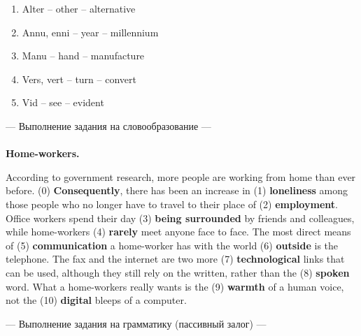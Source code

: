 \documentclass[main.tex]{subfiles}
\begin{document}

\begin{enumerate}[nosep]
	\itemsep\eitsp
	\item Alter -- other -- alternative
	\item Annu, enni -- year -- millennium
	\item Manu -- hand -- manufacture
	\item Vers, vert -- turn -- convert
	\item Vid -- see -- evident
\end{enumerate}
\vspace{7pt}

\newpage
{}

--- Выполнение задания на словообразование ---
\\

\\

\textbf{Home-workers.}

According to government research, more people are working from home than ever before.
(0) \textbf{Consequently}, there has been an increase in (1) \textbf{loneliness} among those people who no longer have to travel to their place of (2) \textbf{employment}.
Office workers spend their day (3) \textbf{being surrounded} by friends and colleagues, while home-workers (4) \textbf{rarely} meet anyone face to face.
The most direct means of (5) \textbf{communication} a home-worker has with the world (6) \textbf{outside} is the telephone.
The fax and the internet are two more (7) \textbf{technological} links that can be used, although they still rely on the written, rather than the (8) \textbf{spoken} word.
What a home-workers really wants is the (9) \textbf{warmth} of a human voice, not the (10) \textbf{digital} bleeps of a computer.
\\

\newpage
{}

--- Выполнение задания на грамматику (пассивный залог) ---
\\

\end{document}

